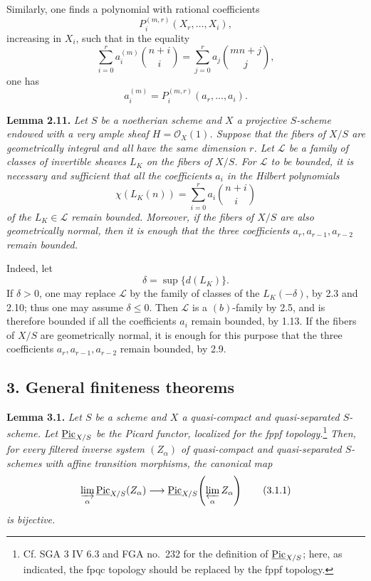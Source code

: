 Similarly, one finds a polynomial with rational coefficients
\[
P_i^{(m,r)}(X_r,\ldots,X_i),
\]
increasing in \(X_i\), such that in the equality
\[
\sum_{i=0}^{r}a_i^{(m)}\binom{n+i}{i}
=\sum_{j=0}^{r}a_j\binom{mn+j}{j},
\]
one has
\[
a_i^{(m)}=P_i^{(m,r)}(a_r,\ldots,a_i).
\]

\textbf{Lemma 2.11.} \emph{Let \(S\) be a noetherian scheme and \(X\)
a projective \(S\)-scheme endowed with a very ample sheaf
\(H=\mathcal O_X(1)\). Suppose that the fibers of \(X/S\) are
geometrically integral and all have the same dimension \(r\). Let
\(\mathcal L\) be a family of classes of invertible sheaves \(L_K\) on the
fibers of \(X/S\). For \(\mathcal L\) to be bounded, it is necessary and
sufficient that all the coefficients \(a_i\) in the Hilbert polynomials}
\[
\chi(L_K(n))=\sum_{i=0}^{r}a_i\binom{n+i}{i}
\]
\emph{of the \(L_K\in\mathcal L\) remain bounded. Moreover, if the
fibers of \(X/S\) are also geometrically normal, then it is enough that
the three coefficients \(a_r,a_{r-1},a_{r-2}\) remain bounded.}

Indeed, let
\[
\delta=\sup\{d(L_K)\}.
\]
If \(\delta>0\), one may replace \(\mathcal L\) by the family of classes
of the \(L_K(-\delta)\), by 2.3 and 2.10; thus one may assume
\(\delta\le0\). Then \(\mathcal L\) is a \((b)\)-family by 2.5, and is
therefore bounded if all the coefficients \(a_i\) remain bounded, by
1.13. If the fibers of \(X/S\) are geometrically normal, it is enough
for this purpose that the three coefficients \(a_r,a_{r-1},a_{r-2}\)
remain bounded, by 2.9.

\subsection*{3. General finiteness theorems}

\textbf{Lemma 3.1.} \emph{Let \(S\) be a scheme and \(X\) a
quasi-compact and quasi-separated \(S\)-scheme. Let
\(\underline{\operatorname{Pic}}_{X/S}\) be the Picard functor, localized for the fppf
topology.}\footnote{Cf. SGA 3 IV 6.3 and FGA no.~232 for the definition of
\(\underline{\operatorname{Pic}}_{X/S}\); here, as indicated, the fpqc topology should be
replaced by the fppf topology.}
\emph{Then, for every filtered inverse system \((Z_\alpha)\) of
quasi-compact and quasi-separated \(S\)-schemes with affine transition
morphisms, the canonical map}
\begin{equation}
\varinjlim_\alpha\underline{\operatorname{Pic}}_{X/S}(Z_\alpha)
\longrightarrow
\underline{\operatorname{Pic}}_{X/S}\!\left(\varprojlim_\alpha Z_\alpha\right)
\tag{3.1.1}
\end{equation}
\emph{is bijective.}

